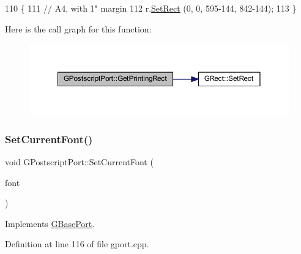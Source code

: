 \begin{DoxyCode}
110 \{
111     \textcolor{comment}{// A4, with 1" margin}
112     r.\mbox{\hyperlink{class_g_rect_a1fd6fd632b6d3c068382766a0c18340f}{SetRect}} (0, 0, 595-144, 842-144);
113 \}
\end{DoxyCode}
Here is the call graph for this function\+:\nopagebreak
\begin{figure}[H]
\begin{center}
\leavevmode
\includegraphics[width=350pt]{class_g_postscript_port_a02890465f3bd98983cfaa026448156f1_cgraph}
\end{center}
\end{figure}
\mbox{\label{class_g_postscript_port_a85705800844e412facdd5a08be9cf46b}} 
\subsubsection{\texorpdfstring{Set\+Current\+Font()}{SetCurrentFont()}}
{\footnotesize\ttfamily void G\+Postscript\+Port\+::\+Set\+Current\+Font (\begin{DoxyParamCaption}\item[{\mbox{\hyperlink{class_g_base_font}{G\+Base\+Font}} \&}]{font }\end{DoxyParamCaption})\hspace{0.3cm}{\ttfamily [virtual]}}



Implements \mbox{\hyperlink{class_g_base_port_af297609a9f7ed9d29d77072037888f5e}{G\+Base\+Port}}.



Definition at line 116 of file gport.\+cpp.


